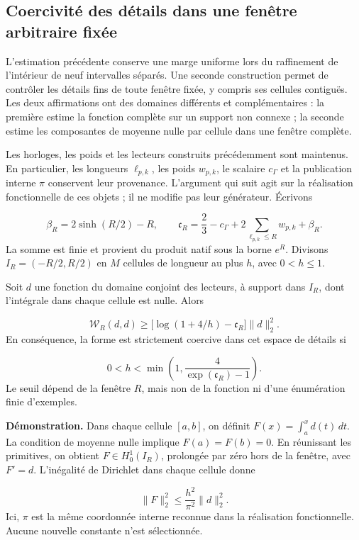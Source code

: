 \subsection{Coercivité des détails dans une fenêtre arbitraire fixée}
\label{viii:rz:detalles}
L’estimation précédente conserve une marge uniforme lors du raffinement de l’intérieur de neuf intervalles séparés. Une seconde construction permet de contrôler les détails fins de toute fenêtre fixée, y compris ses cellules contiguës. Les deux affirmations ont des domaines différents et complémentaires : la première estime la fonction complète sur un support non connexe ; la seconde estime les composantes de moyenne nulle par cellule dans une fenêtre complète.

Les horloges, les poids et les lecteurs construits précédemment sont maintenus. En particulier, les longueurs \(\ell_{p,k}\), les poids \(w_{p,k}\), le scalaire \(c_\Gamma\) et la publication interne \(\pi\) conservent leur provenance. L'argument qui suit agit sur la réalisation fonctionnelle de ces objets ; il ne modifie pas leur générateur. Écrivons

\[
\beta_R=2\sinh(R/2)-R,\qquad
\mathfrak c_R=\frac23-c_\Gamma+
2\sum_{\ell_{p,k}\leq R}w_{p,k}+\beta_R.
\]
La somme est finie et provient du produit natif sous la borne \(e^R\). Divisons \(I_R=(-R/2,R/2)\) en \(M\) cellules de longueur au plus \(h\), avec \(0<h\leq1\).

Soit \(d\) une fonction du domaine conjoint des lecteurs, à support dans \(I_R\), dont l'intégrale dans chaque cellule est nulle. Alors

\[
\boxed{\mathscr W_R(d,d)\geq
\bigl[\log(1+4/h)-\mathfrak c_R\bigr]\|d\|_2^2.}
\]
En conséquence, la forme est strictement coercive dans cet espace de détails si

\[
0<h<\min\left(1,\frac4{\exp(\mathfrak c_R)-1}\right).
\]
Le seuil dépend de la fenêtre \(R\), mais non de la fonction ni d’une énumération finie d’exemples.

\textbf{Démonstration.} Dans chaque cellule \([a,b]\), on définit \(F(x)=\int_a^x d(t)\,dt\). La condition de moyenne nulle implique \(F(a)=F(b)=0\). En réunissant les primitives, on obtient \(F\in H_0^1(I_R)\), prolongée par zéro hors de la fenêtre, avec \(F'=d\). L’inégalité de Dirichlet dans chaque cellule donne

\[
\|F\|_2^2\leq\frac{h^2}{\pi^2}\|d\|_2^2.
\]
Ici, \(\pi\) est la même coordonnée interne reconnue dans la réalisation fonctionnelle. Aucune nouvelle constante n'est sélectionnée.

